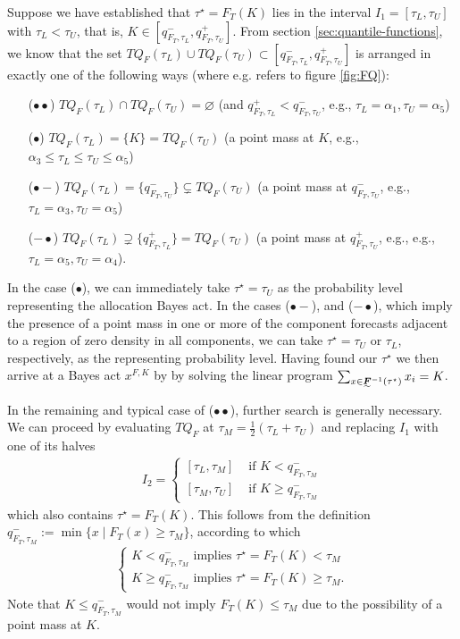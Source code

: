 \documentclass{article}\usepackage[]{graphicx}\usepackage[]{xcolor}
\begin{document}
Suppose we have established that $\tau^{\star} = F_T(K)$ lies in the interval $I_1 = [\tau_L, \tau_U]$ with $\tau_L < \tau_U$,
that is, $K \in [q^{-}_{F_T,\tau_L}, q^{+}_{F_T,\tau_U}]$.
From section \ref{sec:quantile-functions}, we know that the set 
$TQ_F(\tau_L) \cup TQ_F(\tau_U) \subset [q^{-}_{F_T,\tau_L}, q^{+}_{F_T,\tau_U}]$
is arranged in exactly one of the following ways (where e.g. refers to figure \ref{fig:FQ}): 
\begin{itemize}
\item[($\bullet \bullet$)] $TQ_F(\tau_L) \cap TQ_F(\tau_U) = \varnothing$ 
(and $q^{+}_{F_T,\tau_L} < q^{-}_{F_T,\tau_U}$, e.g., $\tau_L=\alpha_1, \tau_U=\alpha_5$)
\item[($\bullet$)] $TQ_F(\tau_L) = \{K\} = TQ_F(\tau_U)$ 
(a point mass at $K$, e.g., $\alpha_3 \leq \tau_L \leq \tau_U \leq \alpha_5$)
\item[($\bullet\!-$)] $TQ_F(\tau_L) = \{q^{-}_{F_T,\tau_U}\} \subsetneq TQ_F(\tau_U)$ 
(a point mass at $q^{-}_{F_T,\tau_U}$, e.g., $\tau_L = \alpha_3, \tau_U = \alpha_5$)
\item[($-\!\bullet$)] $TQ_F(\tau_L) \supsetneq \{q^{+}_{F_T,\tau_L}\} = TQ_F(\tau_U)$ 
(a point mass at $q^{+}_{F_T,\tau_U}$, e.g., e.g., $\tau_L = \alpha_5, \tau_U = \alpha_4$).
\end{itemize}
 
In the case ($\bullet$), we can immediately take 
$\tau^{\star}=\tau_U$ as the probability level representing the allocation Bayes act.
In the cases
($\bullet\!-$), and ($-\!\bullet$), which imply the presence of a point mass in one or more of the 
component forecasts adjacent to a region of zero density in all components, we can take $\tau^{\star}=\tau_U$ or $\tau_L$, 
respectively, as the representing probability level.  
Having found our $\tau^{\star}$ we then arrive at a Bayes act $x^{F,K}$ by by solving the
linear program $\sum_{x \in \undertilde{\bm{F}}^{-1}(\tau^{\star})}x_i = K$.

In the remaining and typical case of ($\bullet \bullet$), further search is generally necessary. We can proceed 
by evaluating $TQ_F$ at $\tau_M = \frac{1}{2}\left(\tau_L + \tau_U\right)$ and replacing $I_1$ with one of its 
halves
\begin{align}
I_2 = 
\begin{cases}
[\tau_L, \tau_M] & \text{ if } K < q^{-}_{F_T,\tau_M} \\
[\tau_M, \tau_U] & \text{ if } K \geq q^{-}_{F_T,\tau_M}
\end{cases}
\end{align}
which also contains $\tau^{\star} = F_T(K)$. This follows from the definition $q^{-}_{F_T,\tau_M} := \min\{x \mid F_T(x) \geq \tau_M\}$, 
according to which
\begin{align}
\begin{cases}
K < q^{-}_{F_T,\tau_M} \text{ implies } \tau^{\star} = F_T(K) < \tau_M  \\
K \geq q^{-}_{F_T,\tau_M} \text{ implies } \tau^{\star} = F_T(K) \geq \tau_M.
\end{cases}
\end{align}
Note that $K \leq q^{-}_{F_T,\tau_M}$ would not imply $F_T(K) \leq \tau_M$ due to the possibility of a point mass at $K$.
\end{document}
